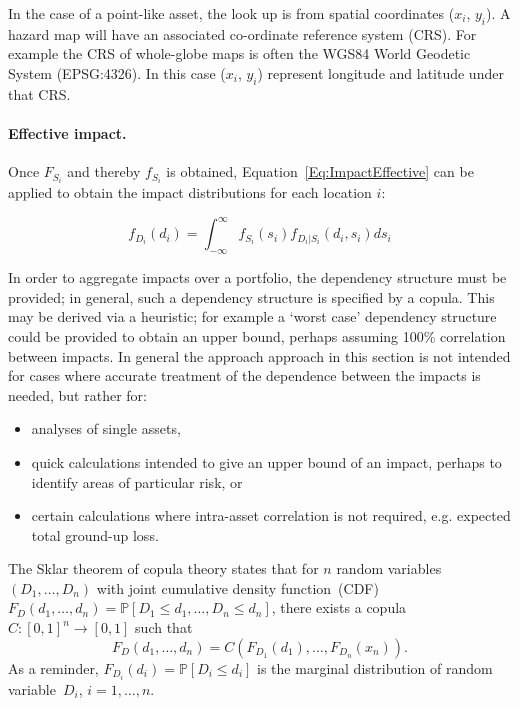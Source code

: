 \documentclass[a4paper,11pt]{extarticle} %
\theoremstyle{definition}
\begin{document}
In the case of a point-like asset, the look up is from spatial coordinates ($x_i$, $y_i$). A hazard map will have an associated co-ordinate reference system (CRS). For example the CRS of whole-globe maps is often the WGS84 World Geodetic System (EPSG:4326). In this case ($x_i$, $y_i$) represent longitude and latitude under that CRS.

\paragraph{Effective impact.} Once $F_{S_i}$ and thereby $f_{S_i}$ is obtained, Equation~\ref{Eq:ImpactEffective} can be applied to obtain the impact distributions for each location $i$:

 \begin{equation}
    \label{Eq:ImpactMarginal2}
    f_{D_i}(d_i) = \int_{-\infty}^{\infty} f_{S_i}(s_i) f_{D_i|S_i}(d_i, s_i) ds_i
\end{equation}

 In order to aggregate impacts over a portfolio, the dependency structure must be provided; in general, such a dependency structure is specified by a copula\cite{Nelsen:2007}. This may be derived via a heuristic; for example a `worst case' dependency structure could be provided to obtain an upper bound, perhaps assuming 100\% correlation between impacts. In general the approach approach in this section is not intended for cases where accurate treatment of the dependence between the impacts is needed, but rather for:

\begin{itemize}
\item analyses of single assets,
\item quick calculations intended to give an upper bound of an impact, perhaps to identify areas of particular risk, or
\item certain calculations where intra-asset correlation is not required, e.g. expected total ground-up loss.
\end{itemize}

The Sklar theorem of copula theory states that for $n$ random variables~$(D_1, \dots, D_n)$ with joint cumulative density function~(CDF)~$F_D(d_1, \dots, d_n) = \mathbb{P}[D_1 \le d_1, \dots, D_n \le d_n]$, there exists a copula~\mbox{$C:[0,1]^n \rightarrow [0,1]$} such that
\begin{equation}
    \label{Eq:Copula}
    F_D(d_1, \dots, d_n) = C \left( F_{D_1}(d_1), \dots, F_{D_n}(x_n) \right).
\end{equation}
As a reminder, $F_{D_i}(d_i) = \mathbb{P}[D_i \le d_i]$ is the marginal distribution of random variable~$D_i$, \mbox{$i=1, \dots, n$}.
\end{document}
